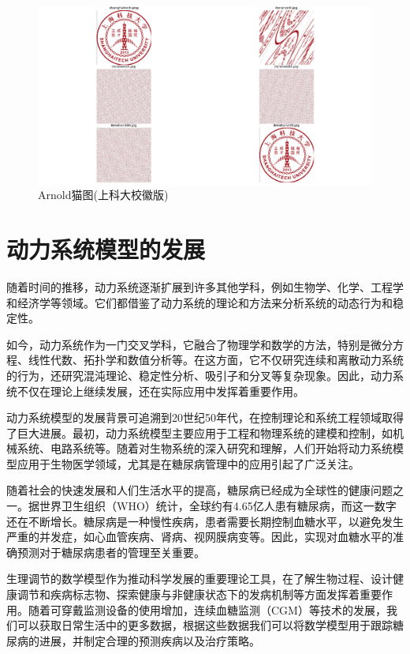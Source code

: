 \begin{figure}[H]
    \centering
    \includegraphics[width=\textwidth]{Img/arnold.png}
    \caption{Arnold猫图(上科大校徽版)}
    \label{fig:arnold_cat_map}
\end{figure}

\section{动力系统模型的发展}
随着时间的推移，动力系统逐渐扩展到许多其他学科，例如生物学、化学、工程学和经济学等领域。它们都借鉴了动力系统的理论和方法来分析系统的动态行为和稳定性。

如今，动力系统作为一门交叉学科，它融合了物理学和数学的方法，特别是微分方程、线性代数、拓扑学和数值分析等。在这方面，它不仅研究连续和离散动力系统的行为，还研究混沌理论、稳定性分析、吸引子和分叉等复杂现象。因此，动力系统不仅在理论上继续发展，还在实际应用中发挥着重要作用。

动力系统模型的发展背景可追溯到20世纪50年代，在控制理论和系统工程领域取得了巨大进展。最初，动力系统模型主要应用于工程和物理系统的建模和控制，如机械系统、电路系统等\cite{hargrove1998dynamic}。随着对生物系统的深入研究和理解，人们开始将动力系统模型应用于生物医学领域，尤其是在糖尿病管理中的应用引起了广泛关注\cite{ellner2006dynamic}。

随着社会的快速发展和人们生活水平的提高，糖尿病已经成为全球性的健康问题之一。据世界卫生组织（WHO）统计，全球约有4.65亿人患有糖尿病，而这一数字还在不断增长\cite{zimmet2016diabetes}。糖尿病是一种慢性疾病，患者需要长期控制血糖水平，以避免发生严重的并发症，如心血管疾病、肾病、视网膜病变等\cite{zheng2018global}。因此，实现对血糖水平的准确预测对于糖尿病患者的管理至关重要。

生理调节的数学模型作为推动科学发展的重要理论工具，在了解生物过程、设计健康调节和疾病标志物、探索健康与非健康状态下的发病机制等方面发挥着重要作用\cite{bakhti2019modelling}。随着可穿戴监测设备的使用增加\cite{kim2020wearable}，连续血糖监测（CGM）等技术的发展，我们可以获取日常生活中的更多数据，根据这些数据我们可以将数学模型用于跟踪糖尿病的进展\cite{ha2020type}，并制定合理的预测疾病以及治疗策略。

